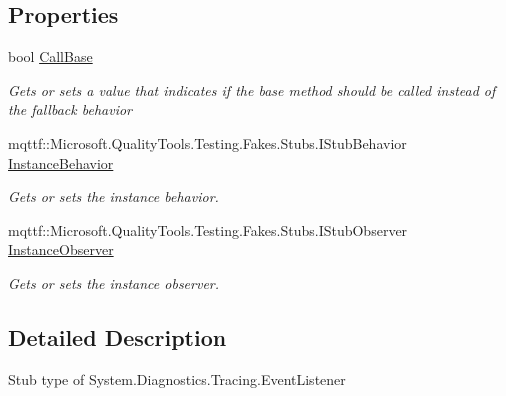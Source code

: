 \subsection*{Properties}
\begin{DoxyCompactItemize}
\item 
bool \hyperlink{class_system_1_1_diagnostics_1_1_tracing_1_1_fakes_1_1_stub_event_listener_a4fdee529565e7276de5e7657c1f6959d}{Call\-Base}
\begin{DoxyCompactList}\small\item\em Gets or sets a value that indicates if the base method should be called instead of the fallback behavior\end{DoxyCompactList}\item 
mqttf\-::\-Microsoft.\-Quality\-Tools.\-Testing.\-Fakes.\-Stubs.\-I\-Stub\-Behavior \hyperlink{class_system_1_1_diagnostics_1_1_tracing_1_1_fakes_1_1_stub_event_listener_a73c0c067f87d82ef513bdcf0759c33cd}{Instance\-Behavior}
\begin{DoxyCompactList}\small\item\em Gets or sets the instance behavior.\end{DoxyCompactList}\item 
mqttf\-::\-Microsoft.\-Quality\-Tools.\-Testing.\-Fakes.\-Stubs.\-I\-Stub\-Observer \hyperlink{class_system_1_1_diagnostics_1_1_tracing_1_1_fakes_1_1_stub_event_listener_a9632efa813e08faca96bc80e3ddce724}{Instance\-Observer}
\begin{DoxyCompactList}\small\item\em Gets or sets the instance observer.\end{DoxyCompactList}\end{DoxyCompactItemize}


\subsection{Detailed Description}
Stub type of System.\-Diagnostics.\-Tracing.\-Event\-Listener



